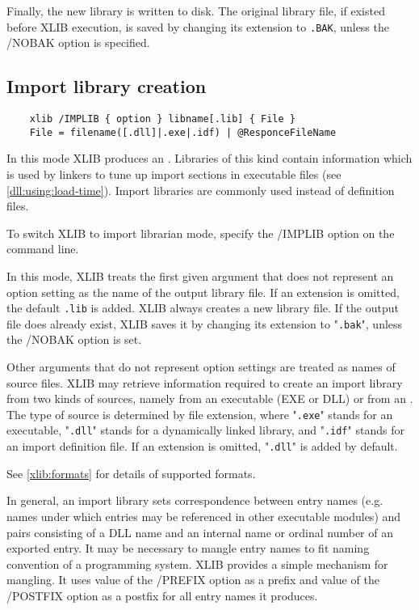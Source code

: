 Finally, the new library is written to disk. The original library file,
if existed before XLIB execution, is saved by changing its
extension to \verb'.BAK', unless the /NOBAK
option is specified.

\subsection{Import library creation}
\label{xlib:modes:import}

\begin{verbatim}
    xlib /IMPLIB { option } libname[.lib] { File }
    File = filename([.dll]|.exe|.idf) | @ResponceFileName
\end{verbatim}

In this mode XLIB produces an .
Libraries of this kind contain information
which is used by linkers to tune up import sections in
executable files (see \ref{dll:using:load-time}).
Import libraries are commonly used instead of definition files.

To switch XLIB to import librarian mode, specify the /IMPLIB
option on the command line.

In this mode, XLIB treats the first given argument that does not
represent an option setting as the name of the output library file.
If an extension is omitted, the default \verb'.lib' is added. XLIB
always creates a new library file. If the output file
does already exist, XLIB saves it by changing its extension
to "\verb'.bak'", unless the /NOBAK option is set.

Other arguments that do not represent option settings are treated
as names of source files. XLIB may retrieve information required
to create an import library from two kinds of sources, namely from
an executable (EXE or DLL) or from an
.
The type of source is determined by file extension,
where "\verb'.exe'" stands for an executable,
"\verb'.dll'" stands for a dynamically linked library,
and "\verb'.idf'" stands for an import definition file.
If an extension is omitted, "\verb'.dll'" is added by default.

See \ref{xlib:formats} for details of supported formats.

In general, an import library sets correspondence between
entry names (e.g. names under which entries may be referenced
in other executable modules) and pairs consisting of a DLL name
and an internal name or ordinal number of an exported entry.
It may be necessary to mangle entry names to fit naming
convention of a programming system. XLIB provides a simple
mechanism for mangling. It uses value of
the /PREFIX option as a prefix and value of the
/POSTFIX option as a postfix for all entry names it produces.

